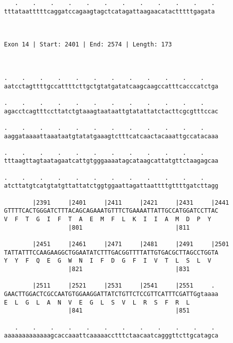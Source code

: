 \documentclass{article}
\begin{document}
\begin{Verbatim}
   .    .    .    .    .    .    .    .    .    .    .    .
tttataatttttcaggatccagaagtagctcatagattaagaacatactttttgagata
                                                           
                                                           
 
Exon 14 | Start: 2401 | End: 2574 | Length: 173



.    .    .    .    .    .    .    .    .    .    .    .    
aatcctagttttgccattttcttgctgtatgatatcaagcaagccatttcacccatctga
                                                            
.    .    .    .    .    .    .    .    .    .    .    .    
agacctcagtttccttatctgtaaagtaataattgtatattatctacttcgcgtttccac
                                                            
.    .    .    .    .    .    .    .    .    .    .    .    
aaggataaaattaaataatgtatatgaaagtctttcatcaactacaaattgccatacaaa
                                                            
.    .    .    .    .    .    .    .    .    .    .    .    
tttaagttagtaatagaatcattgtgggaaaatagcataagcattatgttctaagagcaa
                                                            
.    .    .    .    .    .    .    .    .    .    .    .    
atcttatgtcatgtatgttattatctggtggaattagattaattttgttttgatcttagg
                                                            
        |2391     |2401     |2411     |2421     |2431     |2441
GTTTTCACTGGGATCTTTACAGCAGAAATGTTTCTGAAAATTATTGCCATGGATCCTTAC
V  F  T  G  I  F  T  A  E  M  F  L  K  I  I  A  M  D  P  Y  
                  |801                          |811        
  
        |2451     |2461     |2471     |2481     |2491     |2501
TATTATTTCCAAGAAGGCTGGAATATCTTTGACGGTTTTATTGTGACGCTTAGCCTGGTA
Y  Y  F  Q  E  G  W  N  I  F  D  G  F  I  V  T  L  S  L  V  
                  |821                          |831        
  
        |2511     |2521     |2531     |2541     |2551     . 
GAACTTGGACTCGCCAATGTGGAAGGATTATCTGTTCTCCGTTCATTTCGATTGgtaaaa
E  L  G  L  A  N  V  E  G  L  S  V  L  R  S  F  R  L        
                  |841                          |851        
  
   .    .    .    .    .    .    .    .    .    .    .    . 
aaaaaaaaaaaaagcaccaaattcaaaaacctttctaacaatcagggttcttgcatagca
                                                            

\end{Verbatim}
\end{document}
